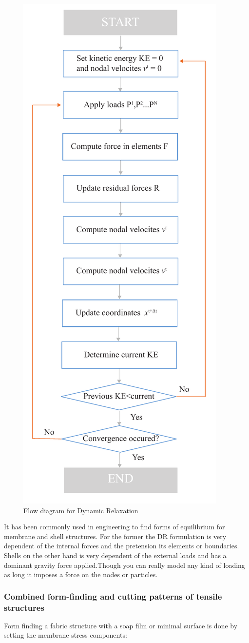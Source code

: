 \begin{figure}[H]
\centering
\includegraphics[height=1.2\linewidth ]{figure/Theory/DRScheme.pdf}
\caption{Flow diagram for Dynamic Relaxation }
\end{figure}

It has been commonly used in engineering to find forms of equilibrium for membrane and shell structures. For the former the DR formulation is very dependent of the internal forces and the pretension its elements or boundaries. Shells on the other hand is very dependent of the external loads and has a dominant gravity force applied.Though you can really model any kind of loading as long it imposes a force on the nodes or particles.

\subsubsection{Combined form-finding and cutting patterns of tensile structures}

Form finding a fabric structure with a soap film or minimal surface is done by setting the membrane stress components:

